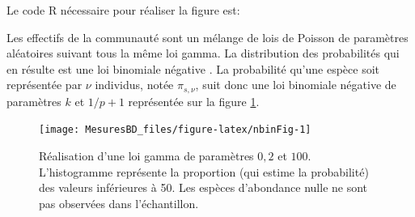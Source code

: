 \documentclass[
  11pt,
  french,
  a4paper,
  extrafontsizes,onecolumn,openright
  ]{memoir}
\newenvironment{Shaded}{\begin{snugshade}}{\end{snugshade}}
\newcommand{\AttributeTok}[1]{\textcolor[rgb]{0.13,0.29,0.53}{#1}}
\newcommand{\DecValTok}[1]{\textcolor[rgb]{0.00,0.00,0.81}{#1}}
\newcommand{\FloatTok}[1]{\textcolor[rgb]{0.00,0.00,0.81}{#1}}
\newcommand{\FunctionTok}[1]{\textcolor[rgb]{0.13,0.29,0.53}{\textbf{#1}}}
\newcommand{\NormalTok}[1]{#1}
\newcommand{\OtherTok}[1]{\textcolor[rgb]{0.56,0.35,0.01}{#1}}
\newcommand{\SpecialCharTok}[1]{\textcolor[rgb]{0.81,0.36,0.00}{\textbf{#1}}}
\newcommand{\StringTok}[1]{\textcolor[rgb]{0.31,0.60,0.02}{#1}}
\begin{document}
\normalsize

Le code R nécessaire pour réaliser la figure est:

\scriptsize

\begin{Shaded}
\end{Shaded}

\normalsize

Les effectifs de la communauté sont un mélange de lois de Poisson de paramètres aléatoires suivant tous la même loi gamma.
La distribution des probabilités qui en résulte est une loi binomiale négative \autocite{Greenwood1920}.
La probabilité qu'une espèce soit représentée par \(\nu\) individus, notée \({\pi}_{s,\nu}\), suit donc une loi binomiale négative de paramètres \(k\) et \({1}/{p+1}\) représentée sur la figure \ref{fig:nbinFig}.



\scriptsize

\begin{figure}

{\centering \texttt{[image: MesuresBD\_files/figure-latex/nbinFig-1]} 

}

\caption{Réalisation d'une loi gamma de paramètres \(0,2\) et \(100\). L'histogramme représente la proportion (qui estime la probabilité) des valeurs inférieures à 50. Les espèces d'abondance nulle ne sont pas observées dans l'échantillon.}\label{fig:nbinFig}
\end{figure}
\end{document}
